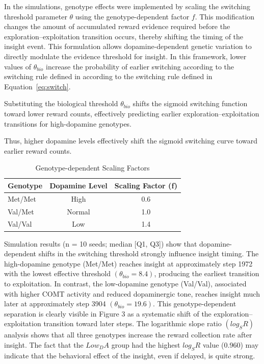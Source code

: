 In the simulations, genotype effects were implemented by scaling the 
switching threshold parameter $\theta$ using the genotype-dependent 
factor $f$. This modification changes the amount of accumulated reward 
evidence required before the exploration–exploitation transition occurs, 
thereby shifting the timing of the insight event.
This formulation allows dopamine-dependent genetic variation to directly 
modulate the evidence threshold for insight. In this framework, lower 
values of $\theta_{bio}$ increase the probability of earlier switching 
according to the switching rule defined in
according to the switching rule defined in Equation~\ref{eq:switch}. 

Substituting the biological threshold $\theta_{bio}$ shifts the sigmoid 
switching function toward lower reward counts, effectively predicting 
earlier exploration–exploitation transitions for high-dopamine genotypes.

Thus, higher dopamine levels effectively shift the sigmoid switching 
curve toward earlier reward counts.



\begin{table}[htbp]
\centering
\caption{Genotype-dependent Scaling Factors}
\label{tab:genotypes}
\begin{tabular}{lcc}
\toprule
\textbf{Genotype} & \textbf{Dopamine Level} & \textbf{Scaling Factor (f)} \\
\midrule
Met/Met & High    & 0.6 \\
Val/Met & Normal  & 1.0 \\
Val/Val & Low     & 1.4 \\
\bottomrule
\end{tabular}
\end{table}


Simulation results (n = 10 seeds; median [Q1, Q3]) show that dopamine-dependent shifts in the switching threshold strongly influence insight timing. The high-dopamine genotype (Met/Met) reaches insight at approximately step 1972 with the lowest effective threshold $(\theta_{bio}=8.4)$, producing the earliest transition to exploitation. In contrast, the low-dopamine genotype (Val/Val), associated with higher COMT activity and reduced dopaminergic tone, reaches insight much later at approximately step 3904 $(\theta_{bio}=19.6)$. This genotype-dependent separation is clearly visible in Figure 3 as a systematic shift of the exploration–exploitation transition toward later steps.
The logarithmic slope ratio $(log_SR)$ analysis shows that all three genotypes increase the reward collection rate after insight. The fact that the $Low_DA$ group had the highest $log_SR$ value (0.960) may indicate that the behavioral effect of the insight, even if delayed, is quite strong.